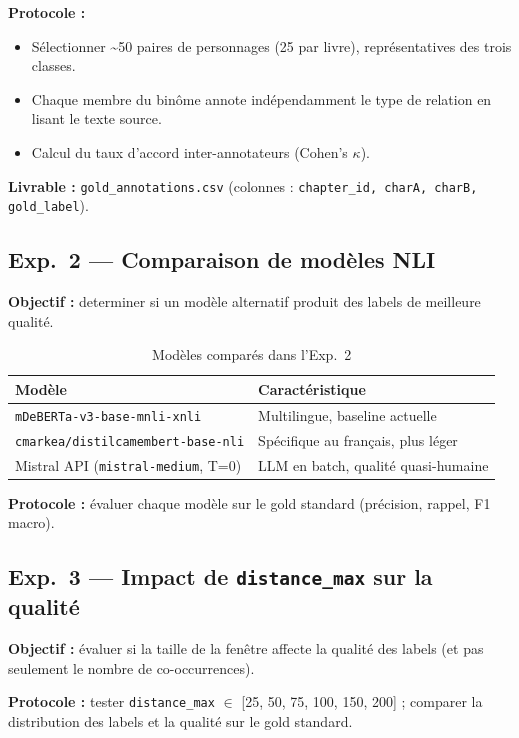 \documentclass[a4paper,11pt]{article}
\begin{document}
\textbf{Protocole :}
\begin{itemize}[noitemsep]
  \item Sélectionner \textasciitilde{}50 paires de personnages (25 par livre),
        représentatives des trois classes.
  \item Chaque membre du binôme annote indépendamment le type de relation en lisant le texte source.
  \item Calcul du taux d'accord inter-annotateurs (Cohen's $\kappa$).
\end{itemize}

\textbf{Livrable :} \texttt{gold\_annotations.csv} (colonnes : \texttt{chapter\_id, charA, charB, gold\_label}).

\subsection*{Exp.\ 2 — Comparaison de modèles NLI}

\textbf{Objectif :} determiner si un modèle alternatif produit des labels de meilleure qualité.

\begin{table}[H]
  \centering
  \small
  \begin{tabular}{lp{8cm}}
    \toprule
    \textbf{Modèle} & \textbf{Caractéristique} \\
    \midrule
    \texttt{mDeBERTa-v3-base-mnli-xnli}     & Multilingue, baseline actuelle \\
    \texttt{cmarkea/distilcamembert-base-nli} & Spécifique au français, plus léger \\
    Mistral API (\texttt{mistral-medium}, T=0) & LLM en batch, qualité quasi-humaine \\
    \bottomrule
  \end{tabular}
  \caption{Modèles comparés dans l'Exp.\ 2}
\end{table}

\textbf{Protocole :} évaluer chaque modèle sur le gold standard (précision, rappel, F1 macro).

\subsection*{Exp.\ 3 — Impact de \texttt{distance\_max} sur la qualité}

\textbf{Objectif :} évaluer si la taille de la fenêtre affecte la qualité des labels (et pas seulement
le nombre de co-occurrences).

\textbf{Protocole :} tester \texttt{distance\_max} $\in$ [25, 50, 75, 100, 150, 200] ;
comparer la distribution des labels et la qualité sur le gold standard.
\end{document}
